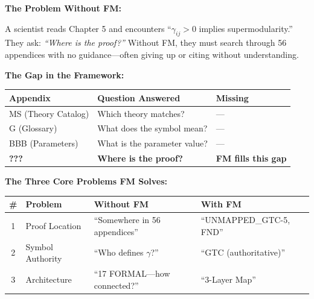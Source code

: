 \begin{tcolorbox}[colback=orange!5!white, colframe=orange!75!black,
    title=\textbf{Motivation: Why Do We Need This Appendix?}]

\textbf{The Problem Without FM:}

A scientist reads Chapter 5 and encounters ``$\gamma_{ij} > 0$ implies supermodularity.''
They ask: \textit{``Where is the proof?''} Without FM, they must search through 56 appendices
with no guidance---often giving up or citing without understanding.

\vspace{0.5em}
\textbf{The Gap in the Framework:}

\begin{center}
\begin{tabular}{|l|l|l|}
\hline
\textbf{Appendix} & \textbf{Question Answered} & \textbf{Missing} \\
\hline
\hline
MS (Theory Catalog) & Which theory matches? & --- \\
G (Glossary) & What does the symbol mean? & --- \\
BBB (Parameters) & What is the parameter value? & --- \\
\textbf{???} & \textbf{Where is the proof?} & \textbf{FM fills this gap} \\
\hline
\end{tabular}
\end{center}

\vspace{0.5em}
\textbf{The Three Core Problems FM Solves:}

\begin{center}
\begin{tabular}{|c|l|l|l|}
\hline
\textbf{\#} & \textbf{Problem} & \textbf{Without FM} & \textbf{With FM} \\
\hline
\hline
1 & Proof Location & ``Somewhere in 56 appendices'' & ``UNMAPPED_GTC-5, FND'' \\
2 & Symbol Authority & ``Who defines $\gamma$?'' & ``GTC (authoritative)'' \\
3 & Architecture & ``17 FORMAL---how connected?'' & ``3-Layer Map'' \\
\hline
\end{tabular}
\end{center}


\end{tcolorbox}
